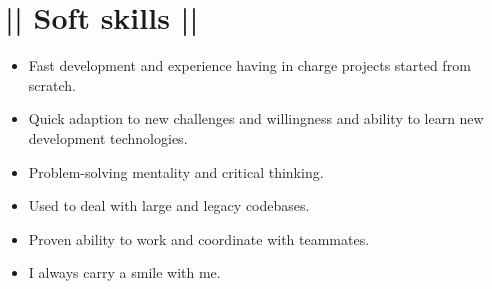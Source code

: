 \section*{|| Soft skills ||}
	\begin{itemize}
		\item Fast development and experience having in charge projects started from scratch.
		\item Quick adaption to new challenges and willingness and ability to learn new development technologies.
		\item Problem-solving mentality and critical thinking.
		\item Used to deal with large and legacy codebases.
		\item Proven ability to work and coordinate with teammates.
		\item I always carry a smile with me.
	\end{itemize}